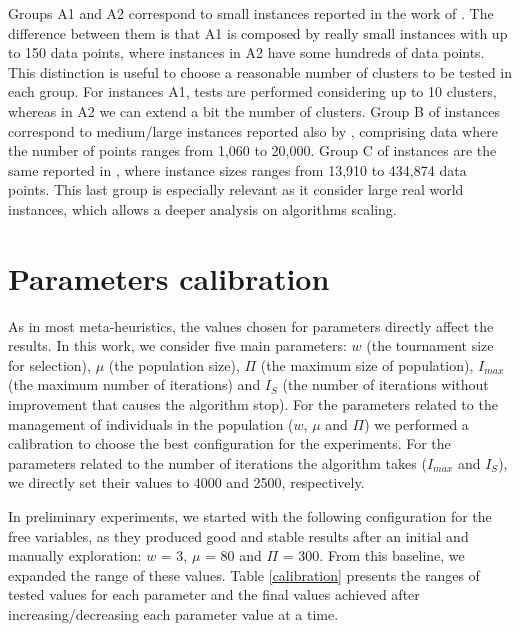 Groups A1 and A2 correspond to small instances reported in the work of \cite{Ordin2014}. The difference between them is that A1 is composed by really small instances with up to 150 data points, where instances in A2 have some hundreds of data points. This distinction is useful to choose a reasonable number of clusters to be tested in each group. For instances A1, tests are performed considering up to 10 clusters, whereas in A2 we can extend a bit the number of clusters. Group B of instances correspond to medium/large instances reported also by \cite{Ordin2014}, comprising data where the number of points ranges from 1,060 to 20,000. Group C of instances are the same reported in \cite{Bagirov2016}, where instance sizes ranges from 13,910 to 434,874 data points. This last group is especially relevant as it consider large real world instances, which allows a deeper analysis on algorithms scaling.

\section{Parameters calibration}
\label{sec:calibration}
As in most meta-heuristics, the values chosen for parameters directly affect the results. In this work, we consider five main parameters: $w$ (the tournament size for selection), $\mu$ (the population size), $\Pi$ (the maximum size of population), $I_{max}$ (the maximum number of iterations) and $I_S$ (the number of iterations without improvement that causes the algorithm stop). For the parameters related to the management of individuals in the population ($w$, $\mu$ and $\Pi$) we performed a calibration to choose the best configuration for the experiments. For the parameters related to the number of iterations the algorithm takes ($I_{max}$ and $I_S$), we directly set their values to 4000 and 2500, respectively.

In preliminary experiments, we started with the following configuration for the free variables, as they produced good and stable results after an initial and manually exploration: $w$ = 3, $\mu$ = 80 and $\Pi$ = 300. From this baseline, we expanded the range of these values. Table \ref{calibration} presents the ranges of tested values for each parameter and the final values achieved after increasing/decreasing each parameter value at a time.



